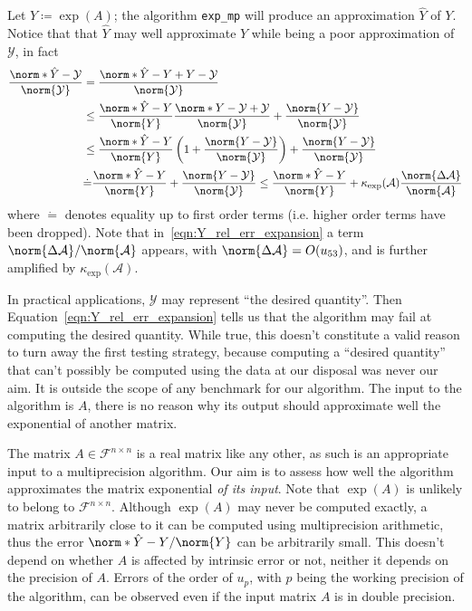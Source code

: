 Let $Y\coloneqq\exp(A)$; the algorithm \texttt{exp\_mp} will produce an approximation $\hat{Y}$ of $Y$. 
Notice that that $\hat{Y}$ may well approximate $Y$ while being a poor approximation of $\mathcal{Y}$, in fact
\begin{equation}\label{eqn:Y_rel_err_expansion}
	\begin{aligned}
		\frac{\norm*{\hat{Y}-\mathcal{Y}}}{\norm{\mathcal{Y}}} &= \frac{\norm*{\hat{Y}-Y+Y-\mathcal{Y}}}{\norm{\mathcal{Y}}}\\
		&\le\frac{\norm*{\hat{Y}-Y}}{\norm{Y}}\frac{\norm*{Y-\mathcal{Y}+\mathcal{Y}}}{\norm{\mathcal{Y}}}+\frac{\norm{Y-\mathcal{Y}}}{\norm{\mathcal{Y}}}\\
		&\le\frac{\norm*{\hat{Y}-Y}}{\norm{Y}}\left(1+\frac{\norm{Y-\mathcal{Y}}}{\norm{\mathcal{Y}}}\right)+\frac{\norm{Y-\mathcal{Y}}}{\norm{\mathcal{Y}}}\\
		&\dot{=}\frac{\norm*{\hat{Y}-Y}}{\norm{Y}}+\frac{\norm{Y-\mathcal{Y}}}{\norm{\mathcal{Y}}}\le\frac{\norm*{\hat{Y}-Y}}{\norm{Y}}+\kappa_{\exp}(\mathcal{A})\frac{\norm{\Delta\mathcal{A}}}{\norm{\mathcal{A}}}
	\end{aligned}
\end{equation}
where $\dot{=}$ denotes equality up to first order terms (i.e. higher order terms have been dropped). Note that in~\eqref{eqn:Y_rel_err_expansion} a term $\norm{\Delta\mathcal{A}}/\norm{\mathcal{A}}$ appears, with $\norm{\Delta\mathcal{A}}=O(u_{53})$, and is further amplified by $\kappa_{\exp}(\mathcal{A})$.

In practical applications, $\mathcal{Y}$ may represent ``the desired quantity''. Then Equation~\eqref{eqn:Y_rel_err_expansion} tells us that the algorithm may fail at computing the desired quantity.
While true, this doesn't constitute a valid reason to turn away the first testing strategy, because computing a ``desired quantity'' that can't possibly be computed using the data at our disposal was never our aim. It is outside the scope of any benchmark for our algorithm. The input to the algorithm is $A$, there is no reason why its output should approximate well the exponential of another matrix.

The matrix $A\in\mathcal{F}^{n\times n}$ is a real matrix like any other, as such is an appropriate input to a multiprecision algorithm. Our aim is to assess how well the algorithm approximates the matrix exponential \emph{of its input}. Note that $\exp(A)$ is unlikely to belong to $\mathcal{F}^{n\times n}$. 
Although $\exp(A)$ may never be computed exactly, a matrix arbitrarily close to it can be computed using multiprecision arithmetic, thus the error $\norm*{\hat{Y}-Y}/\norm{Y}$ can be arbitrarily small. This doesn't depend on whether $A$ is affected by intrinsic error or not, neither it depends on the precision of $A$. Errors of the order of $u_p$, with $p$ being the working precision of the algorithm, can be observed even if the input matrix $A$ is in double precision.

